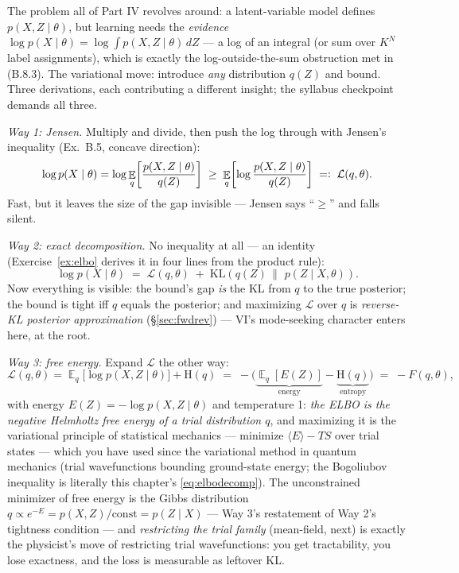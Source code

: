 \documentclass[11pt]{article}
\numberwithin{equation}{section}
\theoremstyle{plain}
\theoremstyle{definition}
\theoremstyle{remark}
\DeclareMathOperator{\E}{\mathbb{E}}
\newcommand{\KL}[2]{\mathrm{KL}\!\left(#1 \,\middle\|\, #2\right)}
\newcommand{\ELBO}{\mathcal{L}}
\newcommand{\Hent}{\mathrm{H}}
\begin{document}
The problem all of Part IV revolves around: a latent-variable model defines $p(X, Z \mid \theta)$, but learning needs the \emph{evidence} $\log p(X \mid \theta) = \log \int p(X, Z \mid \theta)\, dZ$ --- a log of an integral (or sum over $K^N$ label assignments), which is exactly the log-outside-the-sum obstruction met in (B.8.3). The variational move: introduce \emph{any} distribution $q(Z)$ and bound. Three derivations, each contributing a different insight; the syllabus checkpoint demands all three.

\emph{Way 1: Jensen.} Multiply and divide, then push the log through with Jensen's inequality (Ex.\ B.5, concave direction):
\begin{equation}
\log p(X \mid \theta)
= \log \E_{q}\!\left[ \frac{p(X, Z \mid \theta)}{q(Z)} \right]
\;\ge\; \E_{q}\!\left[ \log \frac{p(X, Z \mid \theta)}{q(Z)} \right]
\;=\vcentcolon\; \ELBO(q, \theta).
\label{eq:elbojensen}
\end{equation}
Fast, but it leaves the size of the gap invisible --- Jensen says ``$\ge$'' and falls silent.

\emph{Way 2: exact decomposition.} No inequality at all --- an identity (Exercise~\ref{ex:elbo} derives it in four lines from the product rule):
\begin{equation}
\log p(X \mid \theta) \;=\; \ELBO(q, \theta) \;+\; \KL{q(Z)}{\,p(Z \mid X, \theta)} .
\label{eq:elbodecomp}
\end{equation}
Now everything is visible: the bound's gap \emph{is} the KL from $q$ to the true posterior; the bound is tight iff $q$ equals the posterior; and maximizing $\ELBO$ over $q$ is \emph{reverse-KL posterior approximation} (\S\ref{sec:fwdrev}) --- VI's mode-seeking character enters here, at the root.

\emph{Way 3: free energy.} Expand $\ELBO$ the other way:
\begin{equation}
\ELBO(q, \theta)
= \E_q\big[ \log p(X, Z \mid \theta) \big] + \Hent(q)
\;=\; -\Big( \underbrace{\E_q[E(Z)]}_{\text{energy}} - \underbrace{\Hent(q)}_{\text{entropy}} \Big)
\;=\; -F(q, \theta),
\label{eq:elbofree}
\end{equation}
with energy $E(Z) = -\log p(X, Z \mid \theta)$ and temperature 1: \emph{the ELBO is the negative Helmholtz free energy of a trial distribution $q$}, and maximizing it is the variational principle of statistical mechanics --- minimize $\langle E\rangle - TS$ over trial states --- which you have used since the variational method in quantum mechanics (trial wavefunctions bounding ground-state energy; the Bogoliubov inequality is literally this chapter's \eqref{eq:elbodecomp}). The unconstrained minimizer of free energy is the Gibbs distribution $q \propto e^{-E} = p(X, Z)/\text{const} = p(Z \mid X)$ --- Way 3's restatement of Way 2's tightness condition --- and \emph{restricting the trial family} (mean-field, next) is exactly the physicist's move of restricting trial wavefunctions: you get tractability, you lose exactness, and the loss is measurable as leftover KL.
\end{document}

